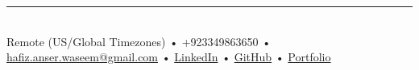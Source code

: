 \documentclass{resume} %
\begin{document}
\rule{\textwidth}{0.4pt}\\[0.3em]
Remote (US/Global Timezones) • +923349863650 • \href{mailto:hafiz.anser.waseem@gmail.com}{hafiz.anser.waseem@gmail.com} • \href{https://www.linkedin.com/in/anserwaseem/}{LinkedIn} • \href{https://github.com/anserwaseem}{GitHub} • \href{https://anserwaseem.com}{Portfolio}\\[0.5em]



\end{document}
